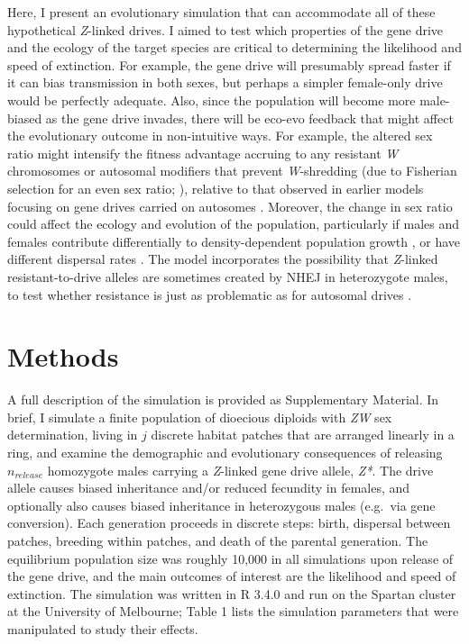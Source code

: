 \documentclass[]{rsos}%
\begin{document}
Here, I present an evolutionary simulation that can accommodate all of
these hypothetical \emph{Z}-linked drives. I aimed to test which
properties of the gene drive and the ecology of the target species are
critical to determining the likelihood and speed of extinction. For
example, the gene drive will presumably spread faster if it can bias
transmission in both sexes, but perhaps a simpler female-only drive
would be perfectly adequate. Also, since the population will become more
male-biased as the gene drive invades, there will be eco-evo feedback
that might affect the evolutionary outcome in non-intuitive ways. For
example, the altered sex ratio might intensify the fitness advantage
accruing to any resistant \emph{W} chromosomes or autosomal modifiers
that prevent \emph{W}-shredding (due to Fisherian selection for an even
sex ratio; \citep{holman2015co}), relative to that observed in earlier
models focusing on gene drives carried on autosomes
\citep{unckless2017ev, drury2017cr}. Moreover, the change in sex ratio
could affect the ecology and evolution of the population, particularly
if males and females contribute differentially to density-dependent
population growth \citep{rankin2007ma, li2019int}, or have different
dispersal rates \citep{li2019sex}. The model incorporates the
possibility that \emph{Z}-linked resistant-to-drive alleles are
sometimes created by NHEJ in heterozygote males, to test whether
resistance is just as problematic as for autosomal drives
\citep{gantz2015mu, gantz2015hi, hammond2016cr, wang2016cr, unckless2017ev}.

\hypertarget{methods}{%
\section{Methods}\label{methods}}

A full description of the simulation is provided as Supplementary
Material. In brief, I simulate a finite population of dioecious diploids
with \emph{ZW} sex determination, living in \(j\) discrete habitat
patches that are arranged linearly in a ring, and examine the
demographic and evolutionary consequences of releasing \(n_{release}\)
homozygote males carrying a \emph{Z}-linked gene drive allele,
\emph{Z*}. The drive allele causes biased inheritance and/or reduced
fecundity in females, and optionally also causes biased inheritance in
heterozygous males (e.g.~via gene conversion). Each generation proceeds
in discrete steps: birth, dispersal between patches, breeding within
patches, and death of the parental generation. The equilibrium
population size was roughly 10,000 in all simulations upon release of
the gene drive, and the main outcomes of interest are the likelihood and
speed of extinction. The simulation was written in R 3.4.0 and run on
the Spartan cluster at the University of Melbourne; Table 1 lists the
simulation parameters that were manipulated to study their effects.
\end{document}
